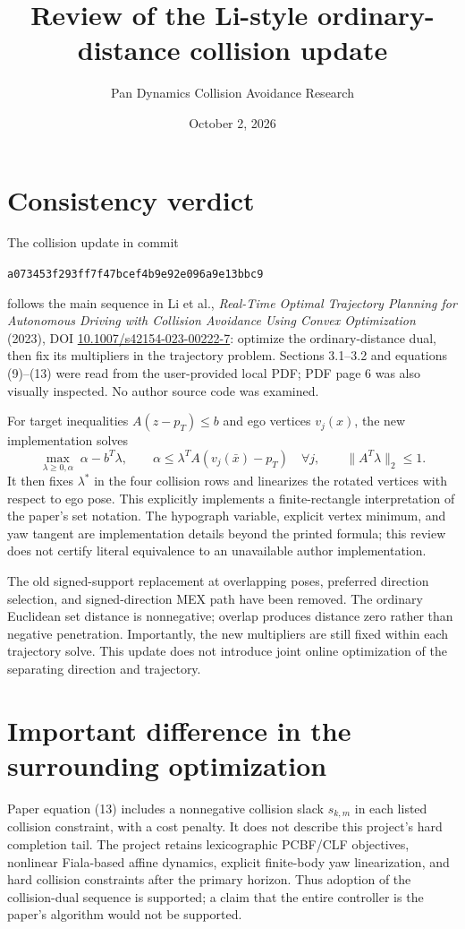 \documentclass[11pt]{article}
\title{Review of the Li-style ordinary-distance collision update}
\author{Pan Dynamics Collision Avoidance Research}
\date{October 2, 2026}
\begin{document}
\maketitle
\section{Consistency verdict}
The collision update in commit
\begin{center}\small\texttt{a073453f293ff7f47bcef4b9e92e096a9e13bbc9}\end{center}
follows the main sequence in Li et al., \emph{Real-Time Optimal Trajectory
Planning for Autonomous Driving with Collision Avoidance Using Convex
Optimization} (2023), DOI
\href{https://doi.org/10.1007/s42154-023-00222-7}{10.1007/s42154-023-00222-7}:
optimize the ordinary-distance dual, then fix its multipliers in the
trajectory problem. Sections 3.1--3.2 and equations (9)--(13) were read from
the user-provided local PDF; PDF page 6 was also visually inspected.
No author source code was examined.

For target inequalities $A(z-p_T)\le b$ and ego vertices $v_j(x)$, the new
implementation solves
\[
 \max_{\lambda\ge0,\alpha}\;\alpha-b^T\lambda,
 \qquad \alpha\le\lambda^TA(v_j(\bar x)-p_T)\quad\forall j,
 \qquad \|A^T\lambda\|_2\le1.
\]
It then fixes $\lambda^*$ in the four collision rows and linearizes the
rotated vertices with respect to ego pose. This explicitly implements a
finite-rectangle interpretation of the paper's set notation. The hypograph
variable, explicit vertex minimum, and yaw tangent are implementation details
beyond the printed formula; this review does not certify literal equivalence
to an unavailable author implementation.

The old signed-support replacement at overlapping poses, preferred direction
selection, and signed-direction MEX path have been removed. The ordinary
Euclidean set distance is nonnegative; overlap produces distance zero rather
than negative penetration. Importantly, the new multipliers are still fixed
within each trajectory solve. This update does not introduce joint online
optimization of the separating direction and trajectory.

\section{Important difference in the surrounding optimization}
Paper equation (13) includes a nonnegative collision slack $s_{k,m}$ in each
listed collision constraint, with a cost penalty. It does not describe this
project's hard completion tail. The project retains lexicographic PCBF/CLF
objectives, nonlinear Fiala-based affine dynamics, explicit finite-body yaw
linearization, and hard collision constraints after the primary horizon.
Thus adoption of the collision-dual sequence is supported; a claim that the
entire controller is the paper's algorithm would not be supported.
\end{document}
